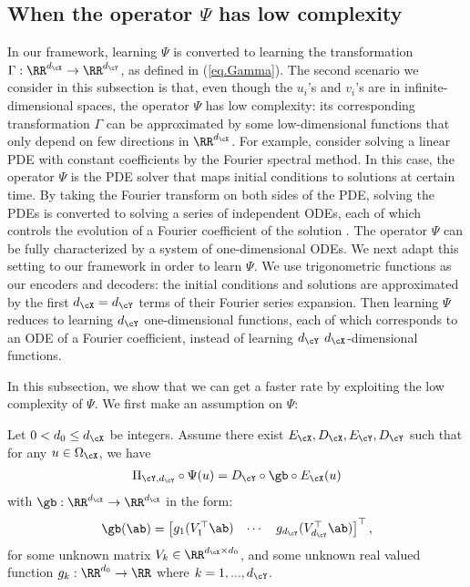 \documentclass[11pt]{article} %
\begin{document}
\subsection{When the operator $\Psi$ has low complexity }
In our framework, learning $\Psi$ is converted to learning the transformation $\Gamma: \RR^{d_{\cX}}\rightarrow\RR^{d_{\cY}}$, as defined in (\ref{eq.Gamma}). 
The second scenario we consider in this subsection is that, even though the $u_i$'s and $v_i$'s are in infinite-dimensional spaces, the operator $\Psi$ has low complexity: its corresponding transformation $\Gamma$ can be approximated by some low-dimensional functions that only depend on few directions in $\RR^{d_{\cX}}$.
For example, consider solving a linear PDE with constant coefficients by the Fourier spectral method. In this case, the operator $\Psi$ is the PDE solver that maps initial conditions to solutions at certain time. By taking the Fourier transform on both sides of the PDE, solving the PDEs is converted to solving a series of independent ODEs, each of which controls the evolution of a Fourier coefficient of the solution \citep[Chapter 2]{shen2011spectral}. The operator $\Psi$  can be fully characterized by a system of one-dimensional ODEs. We next adapt this setting to our framework in order to learn $\Psi$. We use trigonometric functions as our encoders and decoders: the initial conditions and solutions are approximated by the first $d_{\cX}=d_{\cY}$ terms of their Fourier series expansion. Then learning $\Psi$ reduces to learning $d_{\cY}$ one-dimensional functions, each of which corresponds to an ODE of a Fourier coefficient,  instead of learning $d_{\cY}$ $d_{\cX}$-dimensional functions. %

In this subsection, we show that we can get a faster rate by exploiting the low complexity of $\Psi$. We first make an assumption on $\Psi$:
\begin{assumption}\label{assum.Psi.lowCom}
	Let $0<d_0\leq d_{\cX}$ be integers. Assume there exist $E_{\cX},D_{\cX},E_{\cY},D_{\cY}$ such that for any $u\in \Omega_{\cX}$, we have
	\begin{align}
		\Pi_{\cY, d_{\cY}}\circ\Psi(u)=D_{\cY}\circ \gb\circ E_{\cX}(u)
	\end{align}
	with $\gb: \RR^{d_{\cX}} \rightarrow \RR^{d_{\cX}}$ in the form: \begin{equation}\gb(\ab)=\begin{bmatrix}
		g_1(V_1^{\top} \ab) & \cdots & g_{d_{\cY}}(V_{d_{\cY}}^{\top} \ab)
	\end{bmatrix}^{\top},
	\end{equation}
	for some unknown matrix $V_k\in \RR^{d_{\cX}\times d_0}$, and some unknown real valued function $g_k: \RR^{d_0}\rightarrow \RR$ where $k=1,...,d_{\cY}$.
\end{assumption}
\end{document}
